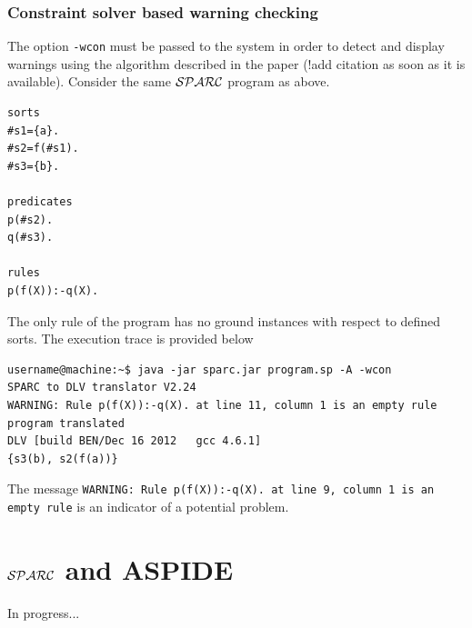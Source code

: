 \documentclass[12pt, letterpaper]{article}
\begin{document}
\subsubsection{Constraint solver based warning checking}\label{clp_type_warnings}

The option \texttt{-wcon} must be passed to the  system  in order to detect and display warnings using the algorithm described in the paper \cite{?} (!add citation as soon as it is available).
Consider the same ${\cal SPARC}$ program as above.

\begin{verbatim}
sorts
#s1={a}.
#s2=f(#s1).
#s3={b}.

predicates
p(#s2).
q(#s3).

rules
p(f(X)):-q(X).
\end{verbatim}

The only rule of the program has no ground instances with respect to defined sorts.
The execution trace is provided below
\begin{verbatim}
username@machine:~$ java -jar sparc.jar program.sp -A -wcon
SPARC to DLV translator V2.24
WARNING: Rule p(f(X)):-q(X). at line 11, column 1 is an empty rule
program translated
DLV [build BEN/Dec 16 2012   gcc 4.6.1]
{s3(b), s2(f(a))}
\end{verbatim}

The message \texttt{WARNING: Rule p(f(X)):-q(X). at line 9, column 1 is an empty rule} is an indicator of a potential problem.

\section{${\cal SPARC}$ and ASPIDE}
In progress... 
\end{document}
